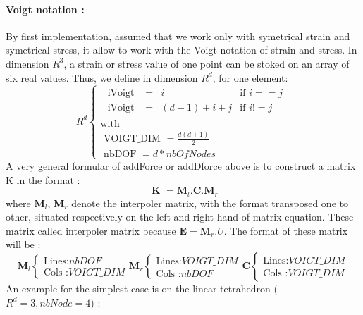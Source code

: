 \documentclass[a4paper,10pt]{article}
\begin{document}
\paragraph{Voigt notation :} By first implementation, assumed that we work only with symetrical strain and symetrical stress, it allow to work with the Voigt notation of strain and stress. In dimension $R^3$, a strain or stress value of one point can be stoked on an array of six real values. Thus, we define in dimension $R^d$, for one element:
\[
R^d
\left\{ 
\begin{array}{l}
  \begin{array}{lccc}
  \text{ iVoigt }   &=& i            & \text{if  } i==j\\
  \text{ iVoigt }   &=& (d-1) +i +j  & \text{if  } i!=j 
  \end{array} \\
\text{with} \\
 \text{ VOIGT\_DIM }   = \frac{d(d+1)}{2} \\
 \text{ nbDOF      }   = d*nbOfNodes  
\end{array}\right.
\]
A very general formular of addForce or addDforce above is to construct a matrix K in the format : 
\[
 \textbf{ K }   = \textbf{M}_l  . \textbf{C} . \textbf{M}_r
\]
where $\textbf{M}_l$, $\textbf{M}_r$ denote the interpoler matrix, with the format transposed one to other, situated respectively on the left and right hand of matrix equation. These matrix called interpoler matrix because $\textbf{E}=\textbf{M}_r.U$. The format of these matrix will be :
\[
\textbf{M}_l 
\left\{ 
\begin{array}{l}
\text{Lines:}       nbDOF        \\
\text{Cols :}       VOIGT\_DIM
\end{array}\right.
\textbf{M}_r 
\left\{ 
\begin{array}{l}
\text{Lines:}       VOIGT\_DIM  \\
\text{Cols :}       nbDOF
\end{array}\right.
\textbf{C} 
\left\{ 
\begin{array}{l}
\text{Lines:}       VOIGT\_DIM \\
\text{Cols :}       VOIGT\_DIM
\end{array}\right.
\]
An example for the simplest case is on the linear tetrahedron ($R^d=3, nbNode=4$) :
\end{document}
